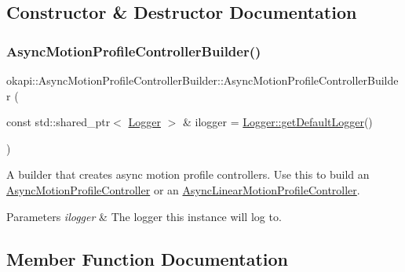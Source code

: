 \subsection{Constructor \& Destructor Documentation}
\mbox{\label{classokapi_1_1AsyncMotionProfileControllerBuilder_ab8f0219b48e74a8ceb72280f20f9b651}} 
\subsubsection{\texorpdfstring{AsyncMotionProfileControllerBuilder()}{AsyncMotionProfileControllerBuilder()}}
{\footnotesize\ttfamily okapi\+::\+Async\+Motion\+Profile\+Controller\+Builder\+::\+Async\+Motion\+Profile\+Controller\+Builder (\begin{DoxyParamCaption}\item[{const std\+::shared\+\_\+ptr$<$ \mbox{\hyperlink{classokapi_1_1Logger}{Logger}} $>$ \&}]{ilogger = {\ttfamily \mbox{\hyperlink{classokapi_1_1Logger_a5053cf778b4b55acba788a3797dc96d2}{Logger\+::get\+Default\+Logger}}()} }\end{DoxyParamCaption})\hspace{0.3cm}{\ttfamily [explicit]}}

A builder that creates async motion profile controllers. Use this to build an \mbox{\hyperlink{classokapi_1_1AsyncMotionProfileController}{Async\+Motion\+Profile\+Controller}} or an \mbox{\hyperlink{classokapi_1_1AsyncLinearMotionProfileController}{Async\+Linear\+Motion\+Profile\+Controller}}.


\begin{DoxyParams}{Parameters}
{\em ilogger} & The logger this instance will log to. \\
\hline
\end{DoxyParams}


\subsection{Member Function Documentation}
\mbox{\label{classokapi_1_1AsyncMotionProfileControllerBuilder_a8e10bfca343f885d73d7b8f370741815}} 
